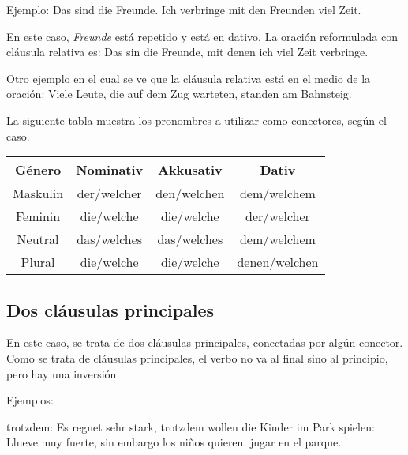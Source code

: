 Ejemplo: Das sind die Freunde. Ich verbringe mit den Freunden viel Zeit. 

En este caso, \textit{Freunde} está repetido y está en dativo. La oración reformulada con cláusula relativa es: Das sin die Freunde, mit denen ich viel Zeit verbringe.

Otro ejemplo en el cual se ve que la cláusula relativa está en el medio de la oración: Viele Leute, die auf dem Zug warteten, standen am Bahnsteig.


La siguiente tabla muestra los pronombres a utilizar como conectores, según el caso.

\begin{tabular}{|c | c | c | c |}
\hline
\textbf{Género} & \textbf{Nominativ} & \textbf{Akkusativ} & \textbf{Dativ}\\
\hline
Maskulin & der/welcher & den/welchen & dem/welchem  \\
Feminin  & die/welche  & die/welche  & der/welcher \\
Neutral  & das/welches & das/welches & dem/welchem \\
Plural   & die/welche  & die/welche  & denen/welchen \\
\hline
\end{tabular}

\subsection{Dos cláusulas principales}
En este caso, se trata de dos cláusulas principales, conectadas por algún conector. Como se trata de cláusulas principales, el verbo no va al final sino al principio, pero hay una inversión.

Ejemplos:
\begin{myitemize}
\item trotzdem: Es regnet sehr stark, trotzdem wollen die Kinder im Park spielen: Llueve muy fuerte, sin embargo los niños quieren. jugar en el parque.
\end{myitemize}
